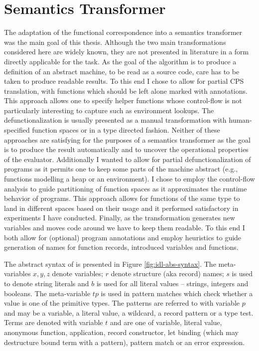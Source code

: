 \chapter{Semantics Transformer}\label{chapter:transformer}
The adaptation of the functional correspondence into a semantics transformer was the main goal of this thesis.
Although the two main transformations considered here are widely known, they are not presented in literature in a form directly applicable for the task.
As the goal of the algorithm is to produce a definition of an abstract machine, to be read as a source code, care has to be taken to produce readable results.
To this end I chose to allow for partial CPS translation, with functions which should be left alone marked with annotations.
This approach allows one to specify helper functions whose control-flow is not particularly interesting to capture such as environment lookups.
The defunctionalization is usually presented as a manual transformation with human-specified function spaces or in a type directed fashion.
Neither of these approaches are satisfying for the purposes of a semantics transformer as the goal is to produce the result automatically and to uncover the operational properties of the evaluator.
Additionally I wanted to allow for partial defunctionalization of programs as it permits one to keep some parts of the machine abstract (e.g., functions modelling a heap or an environment).
I chose to employ the control-flow analysis to guide partitioning of function spaces as it approximates the runtime behavior of programs.
This approach allows for functions of the same type to land in different spaces based on their usage and it performed satisfactory in experiments I have conducted.
Finally, as the transformation generates new variables and moves code around we have to keep them readable.
To this end I both allow for (optional) program annotations and employ heuristics to guide generation of names for function records, introduced variables and functions.

The abstract syntax of \IDL{} is presented in Figure \ref{fig:idl-abs-syntax}.
The meta-variables $x, y, z$ denote variables; $r$ denote structure (aka record) names; $s$ is used to denote string literals and $b$ is used for all literal values -- strings, integers and booleans.
The meta-variable $\mathit{tp}$ is used in pattern matches which check whether a value is one of the primitive types.
The patterns are referred to with variable $p$ and may be a variable, a literal value, a wildcard, a record pattern or a type test.
Terms are denoted with variable $t$ and are one of variable, literal value, anonymous function, application, record constructor, let binding (which may destructure bound term with a pattern), pattern match or an error expression.

